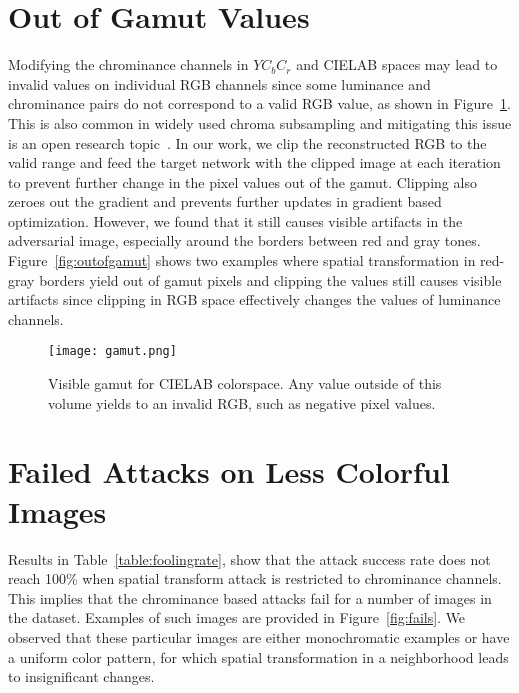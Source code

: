 \section{Out of Gamut Values}
Modifying the chrominance channels in \(YC_{b}C_{r}\) and CIELAB spaces may lead to invalid values on individual RGB channels since some luminance and chrominance pairs do not correspond to a valid RGB value, as shown in Figure~\ref{fig:gamut}. This is also common in widely used chroma subsampling and mitigating this issue is an open research topic~\cite{chan2008toward}. In our work, we clip the reconstructed RGB to the valid range and feed the target network with the clipped image at each iteration to prevent further change in the pixel values out of the gamut. Clipping also zeroes out the gradient and prevents further updates in gradient based optimization. However, we found that it still causes visible artifacts in the adversarial image, especially around the borders between red and gray tones. Figure~\ref{fig:outofgamut} shows two examples where spatial transformation in red-gray borders yield out of gamut pixels and clipping the values still causes visible artifacts since clipping in RGB space effectively changes the values of luminance channels.
\begin{figure}[t]

    \begin{center}
        \texttt{[image: gamut.png]}
    \end{center}
    \caption[Visible gamut for CIELAB]{Visible gamut for CIELAB colorspace. Any value outside of this volume yields to an invalid RGB, such as negative pixel values.}\label{fig:gamut}
\end{figure}


\section{Failed Attacks on Less Colorful Images}
Results in Table~\ref{table:foolingrate}, show that the attack success rate does not reach 100\% when spatial transform attack is restricted to chrominance channels.  %
This implies that the chrominance based attacks fail for a number of images in the dataset. Examples of such images are provided in Figure~\ref{fig:fails}. We observed that these  particular images are either monochromatic examples or have a uniform color pattern, for which spatial transformation in a neighborhood leads to insignificant changes.

